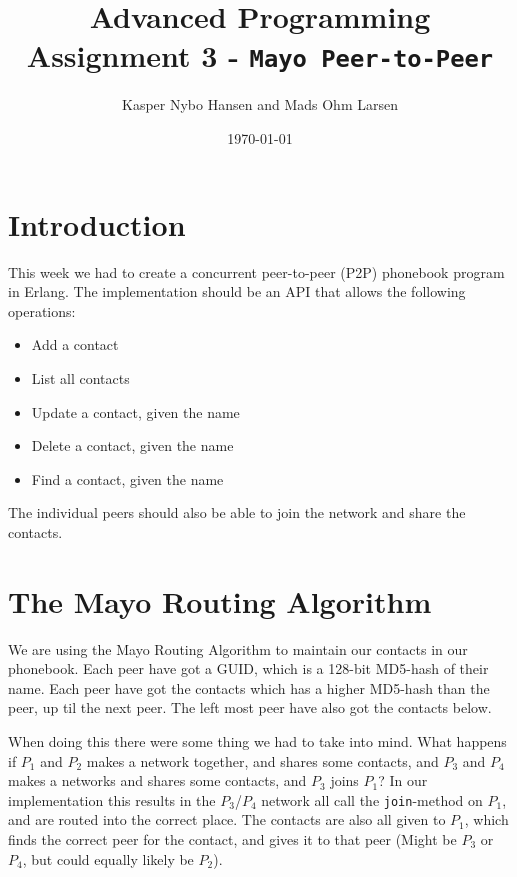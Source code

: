 \documentclass[10pt, a4paper]{article}
\title{Advanced Programming \\\small{Assignment 3} - \texttt{Mayo Peer-to-Peer}}
\author{Kasper Nybo Hansen and Mads Ohm Larsen}
\date{\today}
\begin{document}
	
\maketitle

\section{Introduction} %
\label{sec:introduction}
This week we had to create a concurrent peer-to-peer (P2P) phonebook program in Erlang.
The implementation should be an API that allows the following operations:

\begin{itemize}
	\item Add a contact
	\item List all contacts
	\item Update a contact, given the name
	\item Delete a contact, given the name
	\item Find a contact, given the name
\end{itemize}

The individual peers should also be able to join the network and share the contacts.

\section{The Mayo Routing Algorithm} %
\label{sec:the_mayo_routing_algorithm}
We are using the Mayo Routing Algorithm to maintain our contacts in our phonebook.
Each peer have got a GUID, which is a 128-bit MD5-hash of their name.
Each peer have got the contacts which has a higher MD5-hash than the peer, up til the next peer.
The left most peer have also got the contacts below.

When doing this there were some thing we had to take into mind.
What happens if $P_1$ and $P_2$ makes a network together, and shares some contacts, and $P_3$ and $P_4$ makes a networks and shares some contacts, and $P_3$ joins $P_1$?
In our implementation this results in the $P_3$/$P_4$ network all call the \texttt{join}-method on $P_1$, and are routed into the correct place.
The contacts are also all given to $P_1$, which finds the correct peer for the contact, and gives it to that peer (Might be $P_3$ or $P_4$, but could equally likely be $P_2$).


\end{document}
